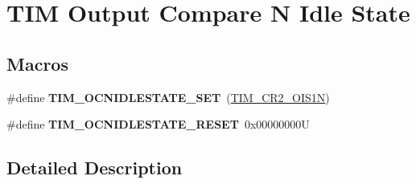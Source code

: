\hypertarget{group___t_i_m___output___compare___n___idle___state}{}\section{T\+IM Output Compare N Idle State}
\label{group___t_i_m___output___compare___n___idle___state}
\subsection*{Macros}
\begin{DoxyCompactItemize}
\item 
\mbox{\label{group___t_i_m___output___compare___n___idle___state_ga1f781774c71822b2502633dfc849c5ea}} 
\#define {\bfseries T\+I\+M\+\_\+\+O\+C\+N\+I\+D\+L\+E\+S\+T\+A\+T\+E\+\_\+\+S\+ET}~(\mbox{\hyperlink{group___peripheral___registers___bits___definition_gae61f8d54923999fffb6db381e81f2b69}{T\+I\+M\+\_\+\+C\+R2\+\_\+\+O\+I\+S1N}})
\item 
\mbox{\label{group___t_i_m___output___compare___n___idle___state_ga7586655652e3c3f1cb4af1ed59d25901}} 
\#define {\bfseries T\+I\+M\+\_\+\+O\+C\+N\+I\+D\+L\+E\+S\+T\+A\+T\+E\+\_\+\+R\+E\+S\+ET}~0x00000000U
\end{DoxyCompactItemize}


\subsection{Detailed Description}
